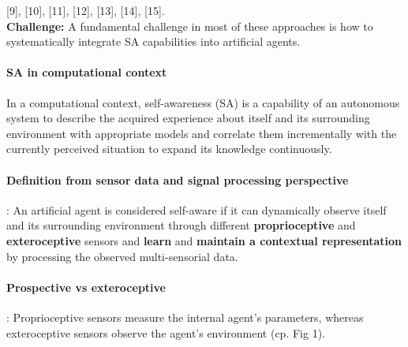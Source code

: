 \documentclass{article}
\begin{document}
		\citet{regazzoni-2020-multi-sensorial-generative-and-descriptive-self-awareness-models-for-autonomous-systems}[9], \citet{regazzoni-2020-multi-sensorial-generative-and-descriptive-self-awareness-models-for-autonomous-systems}[10], \citet{regazzoni-2020-multi-sensorial-generative-and-descriptive-self-awareness-models-for-autonomous-systems}[11], \citet{regazzoni-2020-multi-sensorial-generative-and-descriptive-self-awareness-models-for-autonomous-systems}[12], \citet{regazzoni-2020-multi-sensorial-generative-and-descriptive-self-awareness-models-for-autonomous-systems}[13], \citet{regazzoni-2020-multi-sensorial-generative-and-descriptive-self-awareness-models-for-autonomous-systems}[14], \citet{regazzoni-2020-multi-sensorial-generative-and-descriptive-self-awareness-models-for-autonomous-systems}[15]. 
		\\
		\textbf{Challenge:} A fundamental challenge in most of these approaches is how to systematically integrate SA capabilities into artificial agents.
		
		
		\paragraph{SA in computational context} In a computational context, self-awareness (SA) is a capability of an autonomous system to describe the acquired experience about itself and its surrounding environment with appropriate models and correlate them incrementally with the currently perceived situation to expand its knowledge continuously.
		
		\paragraph{Definition from  sensor data and signal processing perspective}: An artificial agent is considered self-aware if it can dynamically observe itself and its surrounding environment through different \textbf{proprioceptive} and \textbf{exteroceptive} sensors and \textbf{learn} and \textbf{maintain a contextual representation} by processing the observed multi-sensorial data. 

		\paragraph{Prospective vs exteroceptive}: Proprioceptive sensors measure the internal agent's parameters, whereas exteroceptive sensors observe the agent's environment (cp. \cite{regazzoni-2020-multi-sensorial-generative-and-descriptive-self-awareness-models-for-autonomous-systems} Fig 1).
		
\end{document}
